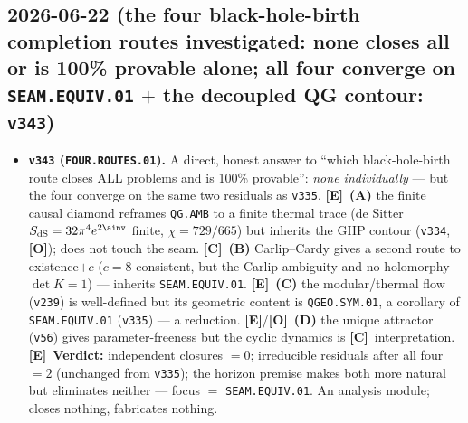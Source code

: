 \documentclass[11pt]{article}
\providecommand{\mE}{\textbf{[E]}}\providecommand{\mC}{\textbf{[C]}}
\providecommand{\mO}{\textbf{[O]}}\providecommand{\mX}{\textbf{[X]}}
\providecommand{\vref}[1]{\texttt{#1}}
\begin{document}
\subsection*{2026-06-22 (the four black-hole-birth completion routes investigated: none closes all or is 100\% provable alone; all four converge on \texttt{SEAM.EQUIV.01} $+$ the decoupled QG contour: \texttt{v343})}
\begin{itemize}
\item \textbf{\texttt{v343} (\texttt{FOUR.ROUTES.01}).} A direct, honest answer to ``which black-hole-birth route
closes ALL problems and is 100\% provable'': \emph{none individually} --- but the four converge on the same two
residuals as \vref{v335}. \mE\ \textbf{(A)} the finite causal diamond reframes \texttt{QG.AMB} to a finite thermal
trace (de Sitter $S_{\mathrm{dS}}=32\pi^4 e^{2\ainv}$ finite, $\chi=729/665$) but inherits the GHP contour
(\vref{v334}, \mO); does not touch the seam. \mC\ \textbf{(B)} Carlip--Cardy gives a second route to existence$+c$
($c{=}8$ consistent, but the Carlip ambiguity and no holomorphy $\det K{=}1$) --- inherits \texttt{SEAM.EQUIV.01}.
\mE\ \textbf{(C)} the modular/thermal flow (\vref{v239}) is well-defined but its geometric content is
\texttt{QGEO.SYM.01}, a corollary of \texttt{SEAM.EQUIV.01} (\vref{v335}) --- a reduction. \mE/\mO\ \textbf{(D)} the
unique attractor (\vref{v56}) gives parameter-freeness but the cyclic dynamics is \mC\ interpretation. \mE\
\textbf{Verdict:} independent closures $=0$; irreducible residuals after all four $=2$ (unchanged from \vref{v335});
the horizon premise makes both more natural but eliminates neither --- focus $=$ \texttt{SEAM.EQUIV.01}. An analysis
module; closes nothing, fabricates nothing.
\end{itemize}
\end{document}
